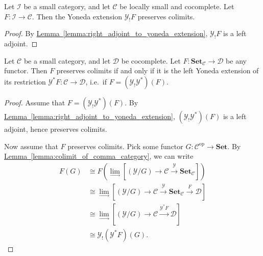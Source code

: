 \documentclass[main.tex]{subfiles}
\begin{document}
\begin{corollary}
  \label{cor:yoneda_extension_results_in_cocontinuous_functor}
  Let $\mathcal{I}$ be a small category, and let $\mathcal{C}$ be locally small and cocomplete. Let $F\colon \mathcal{I} \to \mathcal{C}$. Then the Yoneda extension $\mathcal{Y}_{!}F$ preserves colimits.
\end{corollary}
\begin{proof}
  By \hyperref[lemma:right_adjoint_to_yoneda_extension]{Lemma~\ref*{lemma:right_adjoint_to_yoneda_extension}}, $\mathcal{Y}_{!}F$ is a left adjoint.
\end{proof}

\begin{theorem}
  \label{thm:yoneda_extension_of_restriction_preserves_colimits}
  Let $\mathcal{C}$ be a small category, and let $\mathcal{D}$ be cocomplete. Let $F\colon \mathbf{Set}_{\mathcal{C}} \to \mathcal{D}$ be any functor. Then $F$ preserves colimits if and only if it is the left Yoneda extension of its restriction $\mathcal{Y}^{*}F \colon \mathcal{C} \to \mathcal{D}$, i.e.\ if $F = (\mathcal{Y}_{!}\mathcal{Y}^{*})(F)$.
\end{theorem}
\begin{proof}
  Assume that $F = (\mathcal{Y}_{!}\mathcal{Y}^{*})(F)$. By \hyperref[lemma:right_adjoint_to_yoneda_extension]{Lemma~\ref*{lemma:right_adjoint_to_yoneda_extension}}, $(\mathcal{Y}_{!}\mathcal{Y}^{*})(F)$ is a left adjoint, hence preserves colimits.

  Now assume that $F$ preserves colimits. Pick some functor $G\colon \mathcal{C}^{\mathrm{op}} \to \mathbf{Set}$. By \hyperref[lemma:colimit_of_comma_category]{Lemma~\ref*{lemma:colimit_of_comma_category}}, we can write
  \begin{align*}
    F(G) &\cong F\left( \lim_{\rightarrow}\left[ (\mathcal{Y} / G) \to \mathcal{C} \overset{\mathcal{Y}}{\to} \mathbf{Set}_{\mathcal{C}} \right] \right) \\
    &\cong \lim_{\rightarrow} \left[ (\mathcal{Y} / G) \to \mathcal{C} \overset{\mathcal{Y}}{\to} \mathbf{Set}_{\mathcal{C}}  \overset{F}{\to} \mathcal{D} \right] \\
    &\cong \lim_{\rightarrow} \left[ (\mathcal{Y} / G) \to \mathcal{C} \overset{\mathcal{Y}^{*}F}{\to} \mathcal{D} \right] \\
    &\cong \mathcal{Y}_{!}(\mathcal{Y}^{*}F)(G).
  \end{align*}
\end{proof}
\end{document}
